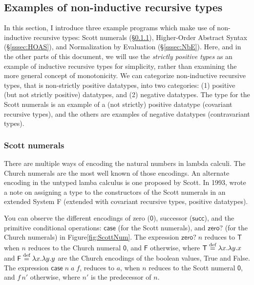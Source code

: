\subsection{Examples of non-inductive recursive types}
\label{ssec:nonindrec}
In this section, I introduce three example programs which make use of
non-inductive recursive types:
Scott numerals (\S\ref{sssec:ScottNum}),
Higher-Order Abstract Syntax (\S\ref{sssec:HOAS}), and
Normalization by Evaluation (\S\ref{sssec:NbE}).
Here, and in the other parts of this document, we will use the
{\em strictly positive types} as an example of inductive recursive types for simplicity,
rather than examining the more general concept of monotonicity.
We can categorize non-inductive recursive types, that is
non-strictly positive datatypes, into two categories:
(1) positive (but not strictly positive) datatypes, and (2) negative datatypes.
The type for the Scott numerals is an example of a (not strictly) positive datatype
(\aka covariant recursive types), and the others are examples of
negative datatypes (\aka contravariant types).

\subsubsection{Scott numerals} \label{sssec:ScottNum}

 There are multiple ways of encoding the natural numbers
in lambda calculi.
The Church numerals are the most well known of those encodings.
An alternate encoding in the untyped lamba calculus is one proposed by Scott.
In 1993, \citet{AbaCarPlo93} wrote a note on assigning a type
to the constructors of the Scott numerals in an extended System F 
(extended with covariant recursive types, \ie positive datatypes). 

You can observe
the different encodings of zero ($\mathsf{0}$), successor ($\mathsf{succ}$),
and the primitive conditional operations: $\mathsf{case}$ (for the Scott numerals),  
and $\textsf{zero?}$ (for the Church numerals) in Figure\;\ref{fig:ScottNum}.
The expression $\textsf{zero?}\;n$ reduces to
$\textsf{T}$ when $n$ reduces to the Church numeral $\mathsf{0}$, and
$\textsf{F}$ otherwise, where $\mathsf{T}\stackrel{\text{def}}{=}\lambda x.\lambda y.x$
and $\mathsf{F}\stackrel{\text{def}}{=}\lambda x.\lambda y.y$ are the Church encodings of
the boolean values, True and False.
The expression $\textsf{case}\;n\;a\;f$, reduces to
$a$, when $n$ reduces to the Scott numeral $\mathsf{0}$, and
$f\,n'$ otherwise, where $n'$ is the predecessor of $n$.

